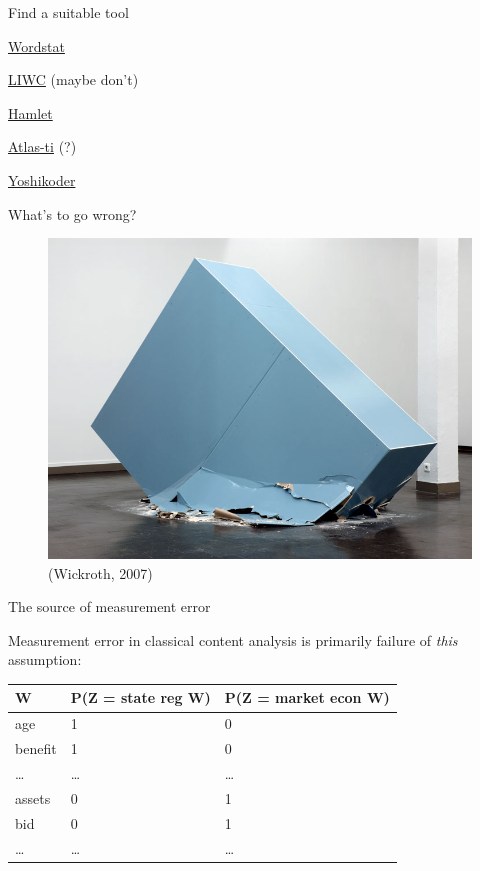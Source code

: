 \documentclass{hertieteaching}
\begin{document}
\begin{frame}{Find a suitable tool}
\protect\hypertarget{find-a-suitable-tool}{}

\href{http://provalisresearch.com/products/content-analysis-software/}{Wordstat}

\href{http://liwc.wpengine.com/}{LIWC} (maybe don't)

\href{http://apb.newmdsx.com/hamlet2.html}{Hamlet}

\href{http://atlasti.com/}{Atlas-ti} (?)

\href{https://github.com/conjugateprior/yoshikoder/releases/tag/v0.6.5}{Yoshikoder}

\end{frame}

\begin{frame}{What's to go wrong?}
\protect\hypertarget{whats-to-go-wrong}{}

\begin{figure}

{\centering \includegraphics[width=0.8\linewidth]{pictures/wickeroth-strategie-der-steine-3-2007} 

}

\caption{(Wickroth, 2007)}\label{fig:unnamed-chunk-14}
\end{figure}

\end{frame}

\begin{frame}{The source of measurement error}
\protect\hypertarget{the-source-of-measurement-error}{}

Measurement error in classical content analysis is primarily failure of
\emph{this} assumption:

\begin{longtable}[]{@{}lll@{}}
\toprule
W & P(Z = state reg \textbar{} W) & P(Z = market econ \textbar{}
W)\tabularnewline
\midrule
\endhead
age & 1 & 0\tabularnewline
benefit & 1 & 0\tabularnewline
\ldots{} & \ldots{} & \ldots{}\tabularnewline
assets & 0 & 1\tabularnewline
bid & 0 & 1\tabularnewline
\ldots{} & \ldots{} & \ldots{}\tabularnewline
\bottomrule
\end{longtable}

\end{frame}
\end{document}
